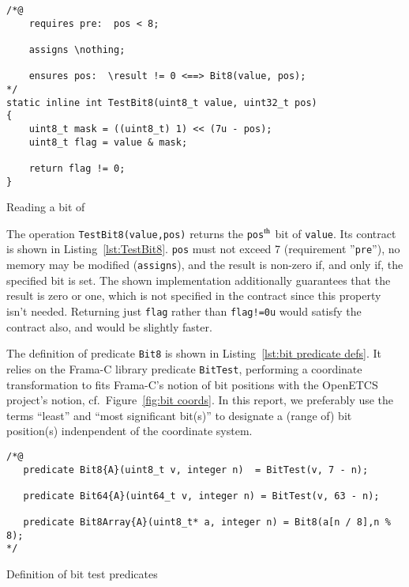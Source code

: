 \begin{listing}[hbt]
\begin{minipage}{0.99\textwidth}
\begin{lstlisting}[style=acsl-block]
/*@
    requires pre:  pos < 8;

    assigns \nothing;

    ensures pos:  \result != 0 <==> Bit8(value, pos);
*/
static inline int TestBit8(uint8_t value, uint32_t pos)
{
    uint8_t mask = ((uint8_t) 1) << (7u - pos);
    uint8_t flag = value & mask;

    return flag != 0;
}
\end{lstlisting}
\end{minipage}
\caption{\label{lst:TestBit8}Reading a bit of }
\end{listing}










The operation \lstinline{TestBit8(value,pos)} returns the
\lstinline{pos}$^{\mbox{\scriptsize th}}$
bit of \lstinline{value}.
%
Its contract is shown in Listing~\ref{lst:TestBit8}.
%
\lstinline{pos} must not exceed 7 (requirement ''\lstinline{pre}''),
no memory may be modified (\lstinline{assigns}), and the result is non-zero if, and only
if, the specified bit is set.
%
The shown implementation additionally guarantees that the result is zero or one, which
is not specified in the contract since this property isn't needed.
%
Returning just \lstinline{flag} rather than \lstinline{flag!=0u} would satisfy the
contract also, and would be slightly faster.

The definition of predicate \lstinline{Bit8} is shown in 
Listing~\ref{lst:bit predicate defs}.
%
It relies on the Frama-C library predicate \lstinline{BitTest}, performing a coordinate
transformation to fits Frama-C's notion of bit positions with the OpenETCS project's
notion, cf.\ Figure~\ref{fig:bit coords}.
%
In this report, we preferably use the terms ``least'' and ``most significant bit(s)'' to
designate a (range of) bit position(s) indenpendent of the coordinate system.






\begin{listing}[hbt]
\begin{minipage}{0.99\textwidth}
\begin{lstlisting}[style=acsl-block]
/*@
   predicate Bit8{A}(uint8_t v, integer n)  = BitTest(v, 7 - n);

   predicate Bit64{A}(uint64_t v, integer n) = BitTest(v, 63 - n);

   predicate Bit8Array{A}(uint8_t* a, integer n) = Bit8(a[n / 8],n % 8);
*/
\end{lstlisting}
\end{minipage}
\caption{\label{lst:bit predicate defs}Definition of bit test predicates}
\end{listing}








